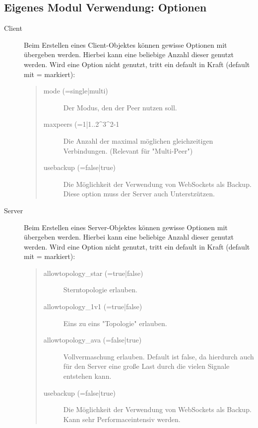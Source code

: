 \subsection{Eigenes Modul Verwendung: Optionen} \label{moduleoptions}
\begin{description}
\item[Client]
Beim Erstellen eines Client-Objektes können gewisse Optionen mit übergeben werden. Hierbei kann eine beliebige Anzahl dieser genutzt werden. Wird eine Option nicht genutzt, tritt ein default in Kraft (default mit = markiert):
\begin{quote}
  \begin{description}
  \item[mode (=single|multi)]
  Der Modus, den der Peer nutzen soll.
  
  \item[maxpeers (=1|1..2^3^2-1]
  Die Anzahl der maximal möglichen gleichzeitigen Verbindungen. (Relevant für "Multi-Peer")

  \item[usebackup (=false|true)]
  Die Möglichkeit der Verwendung von WebSockets als Backup. Diese option muss der Server auch Unterstzützen.
  \end{description}
\end{quote}

\item[Server]
Beim Erstellen eines Server-Objektes können gewisse Optionen mit übergeben werden.
Hierbei kann eine beliebige Anzahl dieser genutzt werden.
Wird eine Option nicht genutzt, tritt ein default in Kraft (default mit = markiert):
\begin{quote}
  \begin{description}
  \item[allowtopology_star (=true|false)]
  Sterntopologie erlauben.
  
  \item[allowtopology_1v1 (=true|false)]
  Eins zu eins "Topologie" erlauben.
  
  \item[allowtopology_ava (=false|true)]
  Vollvermaschung erlauben. Default ist false, da hierdurch auch für den Server eine große Last durch die vielen Signale entstehen kann.  
  
  \item[usebackup (=false|true)]
  Die Möglichkeit der Verwendung von WebSockets als Backup. Kann sehr Performaceintensiv werden.
  \end{description}
\end{quote}
\end{description}



